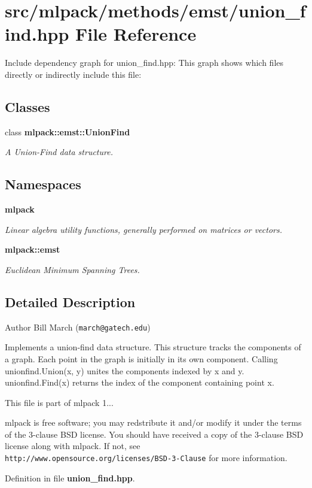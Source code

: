\section{src/mlpack/methods/emst/union\-\_\-find.hpp File Reference}
\label{union__find_8hpp}
Include dependency graph for union\-\_\-find.\-hpp\-:
This graph shows which files directly or indirectly include this file\-:
\subsection*{Classes}
\begin{DoxyCompactItemize}
\item 
class {\bf mlpack\-::emst\-::\-Union\-Find}
\begin{DoxyCompactList}\small\item\em A Union-\/\-Find data structure. \end{DoxyCompactList}\end{DoxyCompactItemize}
\subsection*{Namespaces}
\begin{DoxyCompactItemize}
\item 
{\bf mlpack}
\begin{DoxyCompactList}\small\item\em Linear algebra utility functions, generally performed on matrices or vectors. \end{DoxyCompactList}\item 
{\bf mlpack\-::emst}
\begin{DoxyCompactList}\small\item\em Euclidean Minimum Spanning Trees. \end{DoxyCompactList}\end{DoxyCompactItemize}


\subsection{Detailed Description}
\begin{DoxyAuthor}{Author}
Bill March ({\tt march@gatech.\-edu})
\end{DoxyAuthor}
Implements a union-\/find data structure. This structure tracks the components of a graph. Each point in the graph is initially in its own component. Calling unionfind.\-Union(x, y) unites the components indexed by x and y. unionfind.\-Find(x) returns the index of the component containing point x.

This file is part of mlpack 1...

mlpack is free software; you may redstribute it and/or modify it under the terms of the 3-\/clause B\-S\-D license. You should have received a copy of the 3-\/clause B\-S\-D license along with mlpack. If not, see {\tt http\-://www.\-opensource.\-org/licenses/\-B\-S\-D-\/3-\/\-Clause} for more information. 

Definition in file {\bf union\-\_\-find.\-hpp}.

